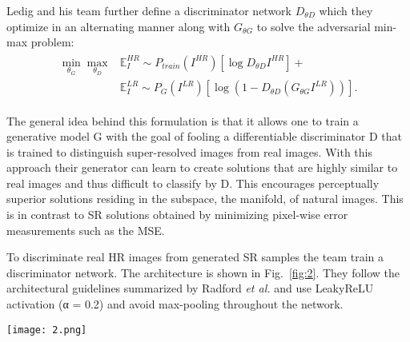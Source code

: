 \documentclass[10pt,twocolumn,letterpaper]{article}
\begin{document}
Ledig and his team further define a discriminator network $D_{\theta D}$ which they optimize in an alternating manner along with $G_{\theta G}$ to solve the adversarial min-max problem:
\begin{equation}
\begin{aligned}
\begin{split}
\min_{\theta_G}\max_{\theta_D}&\mathbb{E}_I^{HR}\sim P_{train}(I^{HR})[\log D_{\theta D}I^{HR}]+\\
&\mathbb{E}_I^{LR}\sim P_G(I^{LR})[\log (1-D_{\theta D}(G_{\theta G}I^{LR}))].   \label{solve}
\end{split}
\end{aligned}
\end{equation}

The general idea behind this formulation is that it allows one to train a generative model G with the goal of fooling a differentiable discriminator D that is trained to distinguish super-resolved images from real images. With this approach their generator can learn to create solutions that are highly similar to real images and thus difficult to classify by D. This encourages perceptually superior solutions residing in the subspace, the manifold, of natural images. This is in contrast to SR solutions obtained by minimizing pixel-wise error measurements such as the MSE.

To discriminate real HR images from generated SR samples the team train a discriminator network. The architecture is shown in Fig.~\ref{fig:2}. They follow the architectural guidelines summarized by Radford \emph{et al.} \cite{Radford2015Unsupervised} and use LeakyReLU activation (α = 0.2) and avoid max-pooling throughout the network. 
\begin{figure*}
	\begin{center}
		\texttt{[image: 2.png]}
	\end{center}
	\caption{Architecture of Generator and Discriminator Network with corresponding kernel size (k), number of feature maps (n) and stride (s) indicated for each convolutional layer.}
	\label{fig:2}
\end{figure*}
\end{document}
